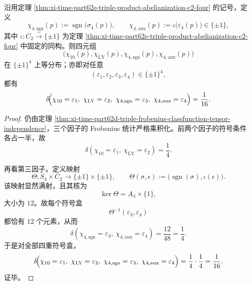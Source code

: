 \begin{theorem}\label{thm:xi-time-part64a-four-quadratic-character-equidistribution}
沿用定理 \ref{thm:xi-time-part62e-triple-product-abelianization-c2-four} 的记号，定义
\[
\chi_{4,\mathrm{sgn}}(p):=\operatorname{sgn}\!\bigl(\sigma_4(p)\bigr),
\qquad
\chi_{4,\mathrm{aux}}(p):=\iota\!\bigl(\varepsilon_4(p)\bigr)\in\{\pm1\},
\]
其中 \(\iota:C_2\xrightarrow{\sim}\{\pm1\}\) 为定理
\ref{thm:xi-time-part62e-triple-product-abelianization-c2-four} 中固定的同构。则四元组
\[
\bigl(
\chi_{10}(p),\chi_{\mathrm{LY}}(p),\chi_{4,\mathrm{sgn}}(p),\chi_{4,\mathrm{aux}}(p)
\bigr)
\]
在 \(\{\pm1\}^4\) 上等分布；亦即对任意
\[
(\varepsilon_1,\varepsilon_2,\varepsilon_3,\varepsilon_4)\in\{\pm1\}^4,
\]
都有
\[
\delta\!\Bigl(
\chi_{10}=\varepsilon_1,\ \chi_{\mathrm{LY}}=\varepsilon_2,\ 
\chi_{4,\mathrm{sgn}}=\varepsilon_3,\ \chi_{4,\mathrm{aux}}=\varepsilon_4
\Bigr)
=
\frac{1}{16}.
\]
\end{theorem}
\begin{proof}
仍由定理 \ref{thm:xi-time-part62d-triple-frobenius-classfunction-tensor-independence}，三个因子的 Frobenius 统计严格乘积化。前两个因子的符号条件各占一半，故
\[
\delta(\chi_{10}=\varepsilon_1,\ \chi_{\mathrm{LY}}=\varepsilon_2)=\frac14.
\]

再看第三因子。定义映射
\[
\Theta:S_4\times C_2\longrightarrow \{\pm1\}\times\{\pm1\},
\qquad
\Theta(\sigma,\epsilon):=\bigl(\operatorname{sgn}(\sigma),\iota(\epsilon)\bigr).
\]
该映射显然满射，且其核为
\[
\ker\Theta=A_4\times\{1\},
\]
大小为 \(12\)。故每个符号盒
\[
\Theta^{-1}(\varepsilon_3,\varepsilon_4)
\]
都恰有 \(12\) 个元素，从而
\[
\delta(\chi_{4,\mathrm{sgn}}=\varepsilon_3,\ \chi_{4,\mathrm{aux}}=\varepsilon_4)
=
\frac{12}{48}
=
\frac14.
\]
于是对全部四重符号盒，
\[
\delta\!\Bigl(
\chi_{10}=\varepsilon_1,\ \chi_{\mathrm{LY}}=\varepsilon_2,\ 
\chi_{4,\mathrm{sgn}}=\varepsilon_3,\ \chi_{4,\mathrm{aux}}=\varepsilon_4
\Bigr)
=
\frac14\cdot\frac14
=
\frac{1}{16}.
\]
证毕。
\end{proof}

